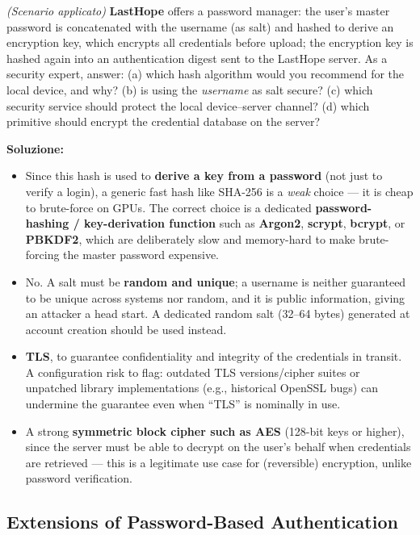 \documentclass[12pt, a4paper]{article}
\newcounter{esercizio}[section]
\begin{document}
\begin{tcolorbox}[colback=lightergray!10, colframe=tocsec, title=\textbf{Esercizio \theesercizio}]
\textit{(Scenario applicato)} \textbf{LastHope} offers a password manager: the user's master password is concatenated with the username (as salt) and hashed to derive an encryption key, which encrypts all credentials before upload; the encryption key is hashed again into an authentication digest sent to the LastHope server. As a security expert, answer: (a) which hash algorithm would you recommend for the local device, and why? (b) is using the \emph{username} as salt secure? (c) which security service should protect the local device–server channel? (d) which primitive should encrypt the credential database on the server?
\end{tcolorbox}

\textbf{Soluzione:}
\begin{itemize}
    \item[(a)] Since this hash is used to \textbf{derive a key from a password} (not just to verify a login), a generic fast hash like SHA-256 is a \emph{weak} choice — it is cheap to brute-force on GPUs. The correct choice is a dedicated \textbf{password-hashing / key-derivation function} such as \textbf{Argon2}, \textbf{scrypt}, \textbf{bcrypt}, or \textbf{PBKDF2}, which are deliberately slow and memory-hard to make brute-forcing the master password expensive.
    \item[(b)] No. A salt must be \textbf{random and unique}; a username is neither guaranteed to be unique across systems nor random, and it is public information, giving an attacker a head start. A dedicated random salt (32--64 bytes) generated at account creation should be used instead.
    \item[(c)] \textbf{TLS}, to guarantee confidentiality and integrity of the credentials in transit. A configuration risk to flag: outdated TLS versions/cipher suites or unpatched library implementations (e.g., historical OpenSSL bugs) can undermine the guarantee even when ``TLS'' is nominally in use.
    \item[(d)] A strong \textbf{symmetric block cipher such as AES} (128-bit keys or higher), since the server must be able to decrypt on the user's behalf when credentials are retrieved — this is a legitimate use case for (reversible) encryption, unlike password verification.
\end{itemize}

\subsection{Extensions of Password-Based Authentication}
\end{document}
